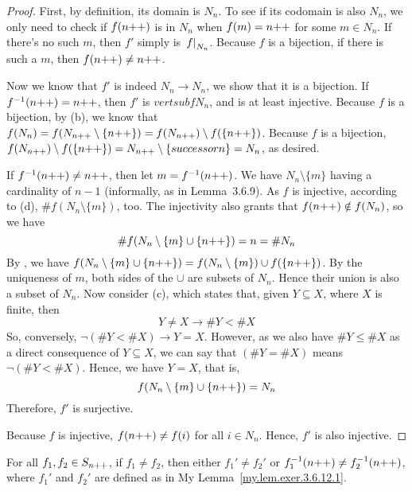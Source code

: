 \begin{proof}
	First, by definition, its domain is $N_n$. To see if its codomain is also $N_n$, we only need to check if $f(n{+}{+})$ is in $N_n$ when $f(m) = n{+}{+}$ for some $m \in N_n$. If there's no such $m$, then $f'$ simply is $\left.f\right|_{N_n}$. Because $f$ is a bijection, if there is such a $m$, then $f(n{+}{+}) \ne n{+}{+}$. 

		Now we know that $f'$ is indeed $N_n \to N_n$, we show that it is a bijection. If $f^{-1}(n{+}{+}) = n{+}{+}$, then $f'$ is $
vertsub{f}{N_n}$, and is at least injective. Because $f$ is a bijection, by  (b), we know that $f(N_n) = f(N_{n{+}{+}} \setminus \{n{+}{+}\}) = f(N_{n{+}{+}}) \setminus f(\{n{+}{+}\})$. Because $f$ is a bijection, $f(N_{n{+}{+}}) \setminus f(\{n{+}{+}\}) = N_{n{+}{+}} \setminus \{successor{n}\} = N_n$, as desired.

		If $f^{-1}(n{+}{+}) \ne n{+}{+}$, then let $m = f^{-1}(n{+}{+})$. We have $N_n \setminus \{m\}$ having a cardinality of $n-1$ (informally, as in Lemma~3.6.9). As $f$ is injective, according to  (d), $\#f(N_n \setminus \{m\})$, too. The injectivity also grants that $f(n{+}{+}) \notin f(N_n)$, so we have 
		\[
			\#f(N_n \setminus \{m\} \cup \{n{+}{+}\}) = n = \#N_n
		\]
		By , we have $f(N_n \setminus \{m\} \cup \{n{+}{+}\}) = f(N_n \setminus \{m\}) \cup f(\{n{+}{+}\})$. By the uniqueness of $m$, both sides of the $\cup$ are subsets of $N_n$. Hence their union is also a subset of $N_n$. Now consider  (c), which states that, given $Y \subseteq X$, where $X$ is finite, then
		\[
			Y \ne X \to \#Y < \#X
		\]
		So, conversely, $\neg(\#Y < \#X) \to Y = X$. However, as we also have $\#Y \le \#X$ as a direct consequence of $Y \subseteq X$, we can say that $(\#Y = \#X)$ means $\neg(\#Y < \#X)$. Hence, we have $Y = X$, that is,
		\[
			f(N_n \setminus \{m\} \cup \{n{+}{+}\}) = N_n
		\]
		Therefore, $f'$ is surjective.

		Because $f$ is injective, $f(n{+}{+}) \ne f(i)$ for all $i \in N_n$. Hence, $f'$ is also injective.
\end{proof}
\begin{lem}\label{my.lem.exer.3.6.12.2}
	For all $f_1 , f_2 \in S_{n{+}{+}}$, if $f_1 \ne f_2$, then either $f_1' \ne f_2'$ or $f_1^{-1}(n{+}{+}) \ne f_2^{-1}(n{+}{+})$, where $f_1'$ and $f_2'$ are defined as in My Lemma~\ref{my.lem.exer.3.6.12.1}.
\end{lem}

